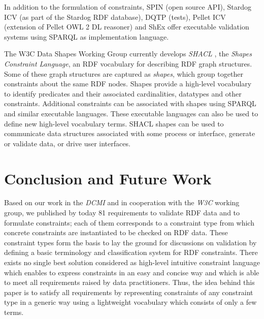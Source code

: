 \documentclass[a4paper,fontsize=11pt]{scrartcl}
\begin{document}
%
%

In addition to the formulation of constraints, SPIN (open source API), Stardog ICV (as part of the Stardog RDF database), DQTP (tests), Pellet ICV (extension of Pellet OWL 2 DL reasoner) and ShEx offer executable validation systems using SPARQL as implementation language.

The W3C Data Shapes Working Group currently develops \emph{SHACL} \cite{W3C-SHACL-2015,W3C-SHACL-2-2015,W3C-SHACL-3-2015}, the \emph{Shapes Constraint Language}, an RDF vocabulary for describing RDF graph structures. Some of these graph structures are captured as \emph{shapes}, which group together constraints about the same RDF nodes. Shapes provide a high-level vocabulary to identify predicates and their associated cardinalities, datatypes and other constraints. Additional constraints can be associated with shapes using SPARQL and similar executable languages. These executable languages can also be used to define new high-level vocabulary terms. SHACL shapes can be used to communicate data structures associated with some process or interface, generate or validate data, or drive user interfaces. 

\section{Conclusion and Future Work}


Based on our work in the \emph{DCMI} and in cooperation with the \emph{W3C} working group,
we published by today 81 requirements to validate RDF data and to formulate constraints; 
each of them corresponds to a constraint type from which concrete constraints are instantiated to be checked on RDF data.
These constraint types form the basis to
lay the ground for discussions on validation
by defining a basic terminology and classification system for RDF constraints.
%
There exists no single best solution considered as high-level intuitive constraint language which enables to express constraints in an easy and concise way and which is able to meet all requirements raised by data practitioners.
Thus, the idea behind this paper is to satisfy all requirements
by representing constraints of any constraint type in a generic way using a lightweight vocabulary which consists of only a few terms.
\end{document}
